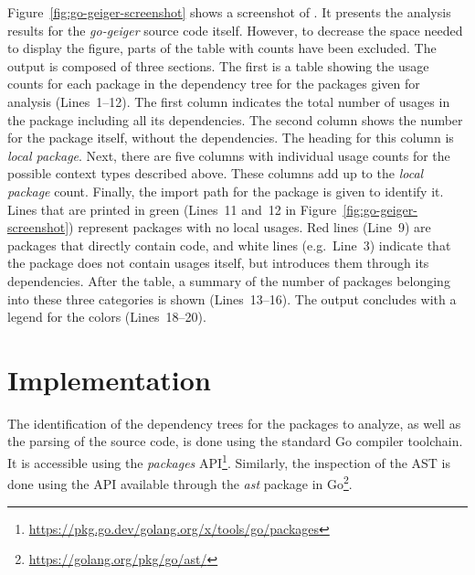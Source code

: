 Figure~\ref{fig:go-geiger-screenshot} shows a screenshot of \toolGeiger{}.
It presents the analysis results for the \textit{go-geiger} source code itself.
However, to decrease the space needed to display the figure, parts of the table with \unsafe{} counts have been
excluded.
The output is composed of three sections.
The first is a table showing the \unsafe{} usage counts for each package in the dependency tree for the packages
given for analysis (Lines~1--12).
The first column indicates the total number of usages in the package including all its dependencies.
The second column shows the number for the package itself, without the dependencies.
The heading for this column is \textit{local package}.
Next, there are five columns with individual usage counts for the possible context types described above.
These columns add up to the \textit{local package} count.
Finally, the import path for the package is given to identify it.
Lines that are printed in green (Lines~11 and~12 in Figure~\ref{fig:go-geiger-screenshot}) represent packages with no
local \unsafe{} usages.
Red lines (Line~9) are packages that directly contain \unsafe{} code, and white lines (e.g.~Line~3) indicate that the
package does not contain \unsafe{} usages itself, but introduces them through its dependencies.
After the table, a summary of the number of packages belonging into these three categories is shown (Lines~13--16).
The output concludes with a legend for the colors (Lines~18--20).



\section{Implementation}\label{sec:go-geiger:implementation}

The identification of the dependency trees for the packages to analyze, as well as the parsing of the source code, is
done using the standard Go compiler toolchain.
It is accessible using the \textit{packages}
\acrshort{API}\footnote{\url{https://pkg.go.dev/golang.org/x/tools/go/packages}}.
Similarly, the inspection of the \acrshort{AST} is done using the \acrshort{API} available through the \textit{ast}
package in Go\footnote{\url{https://golang.org/pkg/go/ast/}}.

